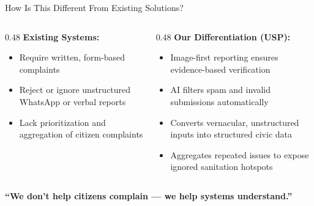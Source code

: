 \documentclass[aspectratio=169]{beamer}
\begin{document}
\begin{frame}{How Is This Different From Existing Solutions?}

\begin{columns}[T]
\begin{column}{0.48\textwidth}
\textbf{\color{red}Existing Systems:}
\begin{itemize}
    \item Require written, form-based complaints
    \item Reject or ignore unstructured WhatsApp or verbal reports
    \item Lack prioritization and aggregation of citizen complaints
\end{itemize}
\end{column}

\begin{column}{0.48\textwidth}
\textbf{\color{secondarygreen}Our Differentiation (USP):}
\begin{itemize}
    \item Image-first reporting ensures evidence-based verification
    \item AI filters spam and invalid submissions automatically
    \item Converts vernacular, unstructured inputs into structured civic data
    \item Aggregates repeated issues to expose ignored sanitation hotspots
\end{itemize}
\end{column}
\end{columns}

\vspace{0.5cm}

\begin{center}
\Large{\textbf{\color{primaryblue}``We don't help citizens complain — we help systems understand.''}}
\end{center}

\end{frame}
\end{document}
